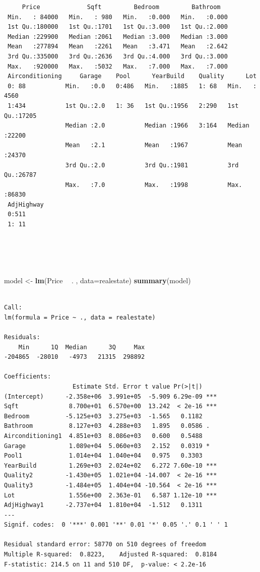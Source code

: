 \documentclass[]{article}
\newenvironment{Shaded}{\begin{snugshade}}{\end{snugshade}}
\newcommand{\DataTypeTok}[1]{\textcolor[rgb]{0.13,0.29,0.53}{#1}}
\newcommand{\KeywordTok}[1]{\textcolor[rgb]{0.13,0.29,0.53}{\textbf{#1}}}
\newcommand{\NormalTok}[1]{#1}
\newcommand{\OperatorTok}[1]{\textcolor[rgb]{0.81,0.36,0.00}{\textbf{#1}}}
\newcommand{\StringTok}[1]{\textcolor[rgb]{0.31,0.60,0.02}{#1}}
\begin{document}
\begin{verbatim}
     Price             Sqft         Bedroom         Bathroom    
 Min.   : 84000   Min.   : 980   Min.   :0.000   Min.   :0.000  
 1st Qu.:180000   1st Qu.:1701   1st Qu.:3.000   1st Qu.:2.000  
 Median :229900   Median :2061   Median :3.000   Median :3.000  
 Mean   :277894   Mean   :2261   Mean   :3.471   Mean   :2.642  
 3rd Qu.:335000   3rd Qu.:2636   3rd Qu.:4.000   3rd Qu.:3.000  
 Max.   :920000   Max.   :5032   Max.   :7.000   Max.   :7.000  
 Airconditioning     Garage    Pool      YearBuild    Quality      Lot       
 0: 88           Min.   :0.0   0:486   Min.   :1885   1: 68   Min.   : 4560  
 1:434           1st Qu.:2.0   1: 36   1st Qu.:1956   2:290   1st Qu.:17205  
                 Median :2.0           Median :1966   3:164   Median :22200  
                 Mean   :2.1           Mean   :1967           Mean   :24370  
                 3rd Qu.:2.0           3rd Qu.:1981           3rd Qu.:26787  
                 Max.   :7.0           Max.   :1998           Max.   :86830  
 AdjHighway
 0:511     
 1: 11     
           
           
           
           
\end{verbatim}

\begin{Shaded}
\begin{Highlighting}[]
\NormalTok{model <-}\StringTok{ }\KeywordTok{lm}\NormalTok{(Price }\OperatorTok{~}\StringTok{ }\NormalTok{. , }\DataTypeTok{data=}\NormalTok{realestate)}
\KeywordTok{summary}\NormalTok{(model)}
\end{Highlighting}
\end{Shaded}

\begin{verbatim}

Call:
lm(formula = Price ~ ., data = realestate)

Residuals:
    Min      1Q  Median      3Q     Max 
-204865  -28010   -4973   21315  298892 

Coefficients:
                   Estimate Std. Error t value Pr(>|t|)    
(Intercept)      -2.358e+06  3.991e+05  -5.909 6.29e-09 ***
Sqft              8.700e+01  6.570e+00  13.242  < 2e-16 ***
Bedroom          -5.125e+03  3.275e+03  -1.565   0.1182    
Bathroom          8.127e+03  4.288e+03   1.895   0.0586 .  
Airconditioning1  4.851e+03  8.086e+03   0.600   0.5488    
Garage            1.089e+04  5.060e+03   2.152   0.0319 *  
Pool1             1.014e+04  1.040e+04   0.975   0.3303    
YearBuild         1.269e+03  2.024e+02   6.272 7.60e-10 ***
Quality2         -1.430e+05  1.021e+04 -14.007  < 2e-16 ***
Quality3         -1.484e+05  1.404e+04 -10.564  < 2e-16 ***
Lot               1.556e+00  2.363e-01   6.587 1.12e-10 ***
AdjHighway1      -2.737e+04  1.810e+04  -1.512   0.1311    
---
Signif. codes:  0 '***' 0.001 '**' 0.01 '*' 0.05 '.' 0.1 ' ' 1

Residual standard error: 58770 on 510 degrees of freedom
Multiple R-squared:  0.8223,    Adjusted R-squared:  0.8184 
F-statistic: 214.5 on 11 and 510 DF,  p-value: < 2.2e-16
\end{verbatim}
\end{document}
